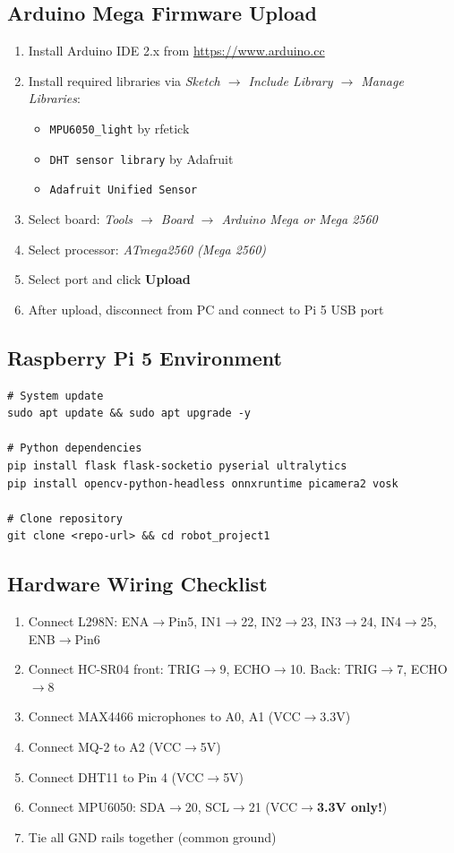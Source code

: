 \documentclass[11pt,a4paper]{article}
\begin{document}
\subsection{Arduino Mega Firmware Upload}
\begin{enumerate}
    \item Install Arduino IDE 2.x from \url{https://www.arduino.cc}
    \item Install required libraries via \textit{Sketch $\rightarrow$ Include Library $\rightarrow$ Manage Libraries}:
    \begin{itemize}
        \item \texttt{MPU6050\_light} by rfetick
        \item \texttt{DHT sensor library} by Adafruit
        \item \texttt{Adafruit Unified Sensor}
    \end{itemize}
    \item Select board: \textit{Tools $\rightarrow$ Board $\rightarrow$ Arduino Mega or Mega 2560}
    \item Select processor: \textit{ATmega2560 (Mega 2560)}
    \item Select port and click \textbf{Upload}
    \item After upload, disconnect from PC and connect to Pi 5 USB port
\end{enumerate}

\subsection{Raspberry Pi 5 Environment}
\begin{verbatim}
# System update
sudo apt update && sudo apt upgrade -y

# Python dependencies
pip install flask flask-socketio pyserial ultralytics
pip install opencv-python-headless onnxruntime picamera2 vosk

# Clone repository
git clone <repo-url> && cd robot_project1
\end{verbatim}

\subsection{Hardware Wiring Checklist}
\begin{enumerate}
    \item Connect L298N: ENA$\rightarrow$Pin5, IN1$\rightarrow$22, IN2$\rightarrow$23, IN3$\rightarrow$24, IN4$\rightarrow$25, ENB$\rightarrow$Pin6
    \item Connect HC-SR04 front: TRIG$\rightarrow$9, ECHO$\rightarrow$10. Back: TRIG$\rightarrow$7, ECHO$\rightarrow$8
    \item Connect MAX4466 microphones to A0, A1 (VCC$\rightarrow$3.3V)
    \item Connect MQ-2 to A2 (VCC$\rightarrow$5V)
    \item Connect DHT11 to Pin 4 (VCC$\rightarrow$5V)
    \item Connect MPU6050: SDA$\rightarrow$20, SCL$\rightarrow$21 (VCC$\rightarrow$\textbf{3.3V only!})
    \item Tie all GND rails together (common ground)
\end{enumerate}
\end{document}
